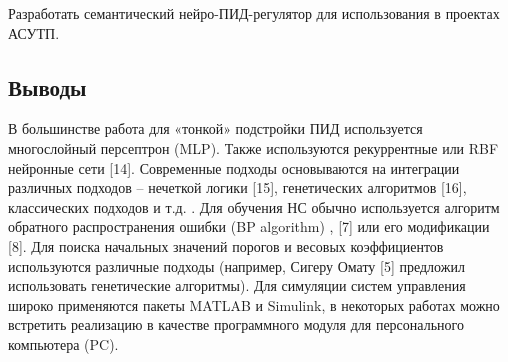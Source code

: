 Разработать семантический нейро-ПИД-регулятор для использования в проектах АСУТП.

\subsection{Выводы}

В большинстве работа для «тонкой» подстройки ПИД используется многослойный персептрон (MLP). Также используются рекуррентные или RBF нейронные сети [14]. Современные подходы основываются на интеграции различных подходов – нечеткой логики [15], генетических алгоритмов [16], классических подходов и т.д. \cite{Omatu_Khalid_Yusof}.
Для обучения НС обычно используется алгоритм обратного распространения ошибки (BP algorithm) \cite{Omatu_Khalid_Yusof}, [7] или его модификации [8]. Для поиска начальных значений порогов и весовых коэффициентов используются различные подходы (например, Сигеру Омату [5] предложил использовать генетические алгоритмы). Для симуляции систем управления широко применяются пакеты MATLAB и Simulink, в некоторых работах можно встретить реализацию в качестве программного модуля для персонального компьютера (PC).
